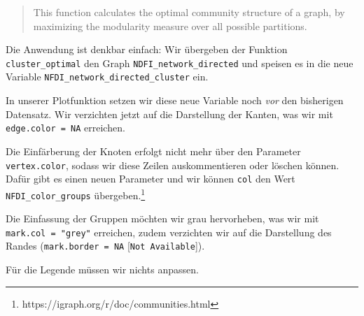 \documentclass[11pt]{article}
\begin{document}
\begin{quote}
This function calculates the optimal community structure of a graph, by
maximizing the modularity measure over all possible partitions.
\end{quote}

Die Anwendung ist denkbar einfach: Wir übergeben der Funktion
\texttt{cluster\_optimal} den Graph \texttt{NDFI\_network\_directed} und
speisen es in die neue Variable
\texttt{NFDI\_network\_directed\_cluster} ein.

    In unserer Plotfunktion setzen wir diese neue Variable noch \emph{vor}
den bisherigen Datensatz. Wir verzichten jetzt auf die Darstellung der
Kanten, was wir mit \texttt{edge.color\ =\ NA} erreichen.

Die Einfärberung der Knoten erfolgt nicht mehr über den Parameter
\texttt{vertex.color}, sodass wir diese Zeilen auskommentieren oder
löschen können. Dafür gibt es einen neuen Parameter und wir können
\texttt{col} den Wert \texttt{NFDI\_color\_groups} übergeben.\footnote{https://igraph.org/r/doc/communities.html}

Die Einfassung der Gruppen möchten wir grau hervorheben, was wir mit
\texttt{mark.col\ =\ "grey"} erreichen, zudem verzichten wir auf die
Darstellung des Randes (\texttt{mark.border\ =\ NA}
{[}\texttt{Not\ Available}{]}).

Für die Legende müssen wir nichts anpassen.
\end{document}
